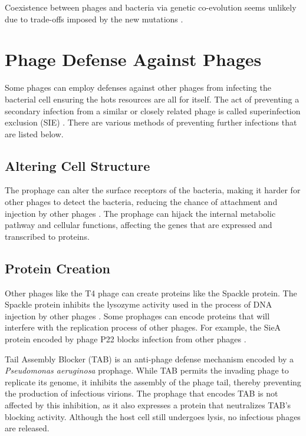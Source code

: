 Coexistence between phages and bacteria via genetic co-evolution seems unlikely due to trade-offs imposed by the new mutations \cite{bullOptimalityModelsPhage2006}. 


\section{Phage Defense Against Phages}
Some phages can employ defenses against other phages from infecting the bacterial cell ensuring the hots resources are all for itself. 
The act of preventing a secondary infection from a similar or closely related phage is called superinfection exclusion (SIE) \cite{patelAntiphageDefenceInhibition2024}. 
There are various methods of preventing further infections that are listed below. 

\subsection{Altering Cell Structure}
The prophage can alter the surface receptors of the bacteria, making it harder for other phages to detect the bacteria, reducing the chance of attachment and injection by other phages \cite{bucherPhageMachineSIEence2024}. 
The prophage can hijack the internal metabolic pathway and cellular functions, affecting the genes that are expressed and transcribed to proteins. 

\subsection{Protein Creation}
Other phages like the T4 phage can create proteins like the Spackle protein. 
The Spackle protein inhibits the lysozyme activity used in the process of DNA injection by other phages \cite{bucherPhageMachineSIEence2024, kanamaruStructureFunctionT42020}. 
Some prophages can encode proteins that will interfere with the replication process of other phages. 
For example, the SieA protein encoded by phage P22 blocks infection from other phages \cite{leavittBacteriophageP22SieAmediated2024}. 

Tail Assembly Blocker (TAB) is an anti-phage defense mechanism encoded by a \textit{Pseudomonas aeruginosa} prophage. 
While TAB permits the invading phage to replicate its genome, it inhibits the assembly of the phage tail, thereby preventing the production of infectious virions. 
The prophage that encodes TAB is not affected by this inhibition, as it also expresses a protein that neutralizes TAB's blocking activity. 
Although the host cell still undergoes lysis, no infectious phages are released.


